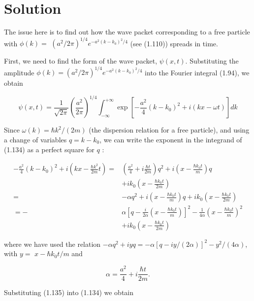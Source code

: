 \documentclass[10pt]{article}
\begin{document}
\section*{Solution}
The issue here is to find out how the wave packet corresponding to a free particle with $\phi(k)=$ $\left(a^{2} / 2 \pi\right)^{1 / 4} e^{-a^{2}\left(k-k_{0}\right)^{2} / 4}$ (see (1.110)) spreads in time.

First, we need to find the form of the wave packet, $\psi(x, t)$. Substituting the amplitude $\phi(k)=\left(a^{2} / 2 \pi\right)^{1 / 4} e^{-a^{2}\left(k-k_{0}\right)^{2} / 4}$ into the Fourier integral (1.94), we obtain


\begin{equation*}
\psi(x, t)=\frac{1}{\sqrt{2 \pi}}\left(\frac{a^{2}}{2 \pi}\right)^{1 / 4} \int_{-\infty}^{+\infty} \exp \left[-\frac{a^{2}}{4}\left(k-k_{0}\right)^{2}+i(k x-\omega t)\right] d k \tag{1.134}
\end{equation*}


Since $\omega(k)=\hbar k^{2} /(2 m)$ (the dispersion relation for a free particle), and using a change of variables $q=k-k_{0}$, we can write the exponent in the integrand of (1.134) as a perfect square for $q$ :


\begin{align*}
-\frac{a^{2}}{4}\left(k-k_{0}\right)^{2}+i\left(k x-\frac{\hbar k^{2}}{2 m} t\right)= & \left(\frac{a^{2}}{4}+i \frac{\hbar t}{2 m}\right) q^{2}+i\left(x-\frac{\hbar k_{0} t}{m}\right) q \\
& +i k_{0}\left(x-\frac{\hbar k_{0} t}{2 m}\right) \\
= & -\alpha q^{2}+i\left(x-\frac{\hbar k_{0} t}{m}\right) q+i k_{0}\left(x-\frac{\hbar k_{0} t}{2 m}\right) \\
=- & \alpha\left[q-\frac{i}{2 \alpha}\left(x-\frac{\hbar k_{0} t}{m}\right)\right]^{2}-\frac{1}{4 \alpha}\left(x-\frac{\hbar k_{0} t}{m}\right)^{2} \\
& +i k_{0}\left(x-\frac{\hbar k_{0} t}{2 m}\right) \tag{1.135}
\end{align*}


where we have used the relation $-\alpha q^{2}+i y q=-\alpha[q-i y /(2 \alpha)]^{2}-y^{2} /(4 \alpha)$, with $y=$ $x-\hbar k_{0} t / m$ and


\begin{equation*}
\alpha=\frac{a^{2}}{4}+i \frac{\hbar t}{2 m} . \tag{1.136}
\end{equation*}


Substituting (1.135) into (1.134) we obtain
\end{document}
